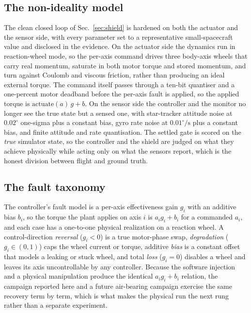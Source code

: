 \documentclass[journal]{IEEEtran}
\begin{document}
\subsection{The non-ideality model} The clean closed loop of Sec.~\ref{sec:shield} is hardened on
both the actuator and the sensor side, with every parameter set to a representative
small-spacecraft value and disclosed in the evidence. On the actuator side the dynamics run in
reaction-wheel mode, so the per-axis command drives three body-axis wheels that carry real
momentum, saturate in both motor torque and stored momentum, and turn against Coulomb and viscous
friction, rather than producing an ideal external torque. The command itself passes through a
ten-bit quantiser and a one-percent motor deadband before the per-axis fault is applied, so the
applied torque is $\mathrm{actuate}(a)\,g + b$. On the sensor side the controller and the monitor
no longer see the true state but a sensed one, with star-tracker attitude noise at $0.02^\circ$
one-sigma plus a constant bias, gyro rate noise at $0.01^\circ/\mathrm{s}$ plus a constant bias,
and finite attitude and rate quantisation. The settled gate is scored on the \emph{true} simulator
state, so the controller and the shield are judged on what they achieve physically while acting
only on what the sensors report, which is the honest division between flight and ground truth.

\subsection{The fault taxonomy} The controller's fault model is a
per-axis effectiveness gain $g_i$ with an additive bias $b_i$, so the torque the plant applies on
axis $i$ is $a_i g_i + b_i$ for a commanded $a_i$, and each case has a one-to-one physical
realization on a reaction wheel. A control-direction \emph{reversal} ($g_i<0$) is a true
motor-phase swap, \emph{degradation} ($g_i\in(0,1)$) caps the wheel current or torque, additive
\emph{bias} is a constant offset that models a leaking or stuck wheel, and total \emph{loss}
($g_i=0$) disables a wheel and leaves its axis uncontrollable by any controller. Because the
software injection and a physical manipulation produce the identical $a_i g_i + b_i$ relation, the
campaign reported here and a future air-bearing campaign exercise the same recovery term by term,
which is what makes the physical run the next rung rather than a separate experiment.
\end{document}
